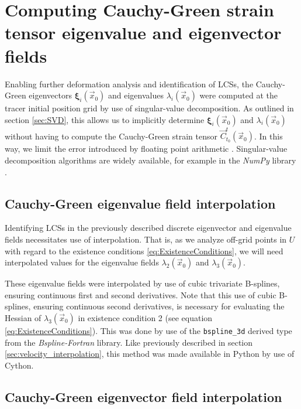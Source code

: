 \section{Computing Cauchy-Green strain tensor eigenvalue and eigenvector fields}\label{sec:Cauchy-Green_eigen}

Enabling further deformation analysis and identification of LCSs, the Cauchy-Green eigenvectors $\bm{\xi}_i(\vec{x}_0)$ and eigenvalues $\lambda_i(\vec{x}_0)$ were computed at the tracer initial position grid by use of singular-value decomposition. As outlined in section \ref{sec:SVD}, this allows us to implicitly determine $\bm{\xi}_i(\vec{x}_0)$ and $\lambda_i(\vec{x}_0)$ without having to compute the Cauchy-Green strain tensor $\vec{C}_{t_0}^{t}(\vec{x}_0)$. In this way, we limit the error introduced by floating point arithmetic \citep{Watkins05}. Singular-value decomposition algorithms are widely available, for example in the \textit{NumPy} library \citep{numpy}.

\subsection{Cauchy-Green eigenvalue field interpolation}\label{sec:eigenvalue_interpolation}

Identifying LCSs in the previously described discrete eigenvector and eigenvalue fields necessitates use of interpolation. That is, as we analyze off-grid points in $U$ with regard to the existence conditions \ref{eq:ExistenceConditions}, we will need interpolated values for the eigenvalue fields $\lambda_2(\vec{x}_0)$ and $\lambda_3(\vec{x}_0)$.

These eigenvalue fields were interpolated by use of cubic trivariate B-splines, ensuring continuous first and second derivatives. Note that this use of cubic B-splines, ensuring continuous second derivatives, is necessary for evaluating the Hessian of $\lambda_3(\vec{x}_0)$ in existence condition 2 (see equation \eqref{eq:ExistenceConditions}). This was done by use of the \texttt{bspline\_}\texttt{3d} derived type from the \textit{Bspline-Fortran} library. Like previously described in section \ref{sec:velocity_interpolation}, this method was made available in Python by use of Cython.

\subsection{Cauchy-Green eigenvector field interpolation}\label{sec:eigenvector_interpolation}

